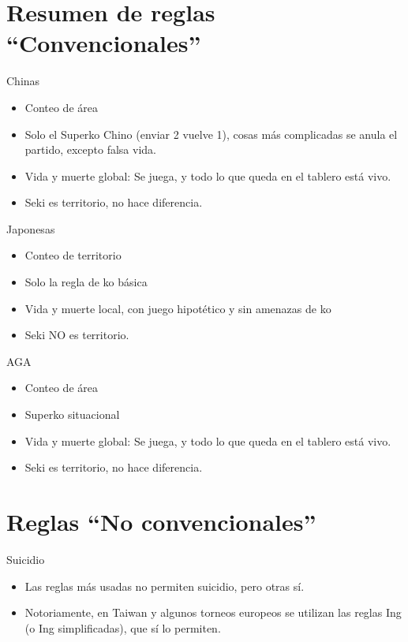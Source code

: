 \documentclass{beamer}
\begin{document}
\section{Resumen de reglas ``Convencionales''}

\begin{frame}{Chinas}
    \begin{itemize}
        \item Conteo de área
        \item Solo el Superko Chino (enviar 2 vuelve 1), cosas más complicadas se anula el partido, excepto falsa vida.
        \item Vida y muerte global: Se juega, y todo lo que queda en el tablero está vivo.
        \item Seki es territorio, no hace diferencia.
    \end{itemize}
\end{frame}

\begin{frame}{Japonesas}
    \begin{itemize}
        \item Conteo de territorio
        \item Solo la regla de ko básica
        \item Vida y muerte local, con juego hipotético y sin amenazas de ko
        \item Seki NO es territorio.
    \end{itemize}
\end{frame}

\begin{frame}{AGA}
    \begin{itemize}
        \item Conteo de área
        \item Superko situacional
        \item Vida y muerte global: Se juega, y todo lo que queda en el tablero está vivo.
        \item Seki es territorio, no hace diferencia.
    \end{itemize}
\end{frame}


\section{Reglas ``No convencionales''}

\begin{frame}{Suicidio}
    \begin{itemize}
        \item Las reglas más usadas no permiten suicidio, pero otras sí.
        \item Notoriamente, en Taiwan y algunos torneos europeos se utilizan las reglas Ing (o Ing simplificadas), que sí lo permiten.
    \end{itemize}
\end{frame}
\end{document}
